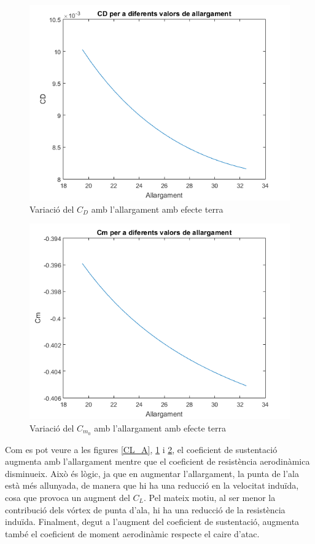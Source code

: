 \begin{figure}[H]
	\centering
	\includegraphics[]{./plots/CD_A}
	\caption{Variació del $C_{D}$ amb l'allargament amb efecte terra}
	\label{CD_A}
\end{figure}

\begin{figure}[H]
	\centering
	\includegraphics[]{./plots/Cm_A}
	\caption{Variació del $C_{m_{0}}$ amb l'allargament amb efecte terra}
	\label{Cm_A}
\end{figure}

Com es pot veure a les figures \ref{CL_A}, \ref{CD_A} i \ref{Cm_A}, el coeficient de sustentació augmenta amb l'allargament mentre que el coeficient de resistència aerodinàmica disminueix. Això és lògic, ja que en augmentar l'allargament, la punta de l'ala està més allunyada, de manera que hi ha una reducció en la velocitat induïda, cosa que provoca un augment del $C_{L}$. Pel mateix motiu, al ser menor la contribució dels vórtex de punta d'ala, hi ha una reducció de la resistència induïda. Finalment, degut a l'augment del coeficient de sustentació, augmenta també el coeficient de moment aerodinàmic respecte el caire d'atac.

